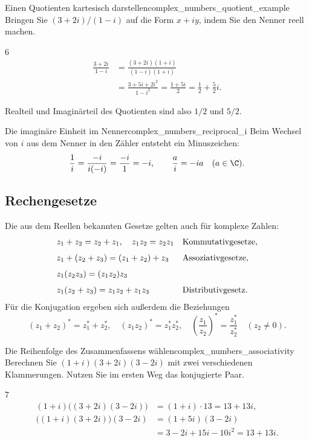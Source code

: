 \begin{ExampleBox}{Einen Quotienten kartesisch darstellen}{complex_numbers_quotient_example}
  Bringen Sie $(3+2i)/(1-i)$ auf die Form $x+iy$, indem Sie den Nenner reell machen.
  \begin{ClozeArea}{6}
    \[
      \begin{aligned}
        \frac{3+2i}{1-i}
          &=\frac{(3+2i)(1+i)}{(1-i)(1+i)}\\[6pt]
          &=\frac{3+5i+2i^2}{1-i^2}
           =\frac{1+5i}{2}=\frac12+\frac52i.
      \end{aligned}
    \]
  \end{ClozeArea}
  Realteil und Imaginärteil des Quotienten sind also $1/2$ und $5/2$.
\end{ExampleBox}
\begin{KeyPointBox}{Die imaginäre Einheit im Nenner}{complex_numbers_reciprocal_i}
  Beim Wechsel von $i$ aus dem Nenner in den Zähler entsteht ein Minuszeichen:
  \[
    \frac1i=\frac{-i}{i(-i)}=\frac{-i}{1}=-i,
    \qquad \frac{a}{i}=-ia\quad(a\in\C).
  \]
\end{KeyPointBox}

\clearpage
\subsection{Rechengesetze}
Die aus dem Reellen bekannten Gesetze gelten auch für komplexe Zahlen:
\[
  \begin{array}{@{}ll@{}}
    z_1+z_2=z_2+z_1,\quad z_1z_2=z_2z_1
      &\text{Kommutativgesetze},\\[7pt]
    z_1+(z_2+z_3)=(z_1+z_2)+z_3
      &\text{Assoziativgesetze},\\[7pt]
    z_1(z_2z_3)=(z_1z_2)z_3&\\[7pt]
    z_1(z_2+z_3)=z_1z_2+z_1z_3
      &\text{Distributivgesetz}.
  \end{array}
\]
Für die Konjugation ergeben sich außerdem die Beziehungen
\[
  (z_1+z_2)^*=z_1^*+z_2^*,\quad
  (z_1z_2)^*=z_1^*z_2^*,\quad
  \left(\frac{z_1}{z_2}\right)^*=\frac{z_1^*}{z_2^*}\quad(z_2\ne0).
\]
\begin{ExampleBox}{Die Reihenfolge des Zusammenfassens wählen}{complex_numbers_associativity}
  Berechnen Sie $(1+i)(3+2i)(3-2i)$ mit zwei verschiedenen Klammerungen.
  Nutzen Sie im ersten Weg das konjugierte Paar.
  \begin{ClozeArea}{7}
    \[
      \begin{aligned}
        (1+i)\bigl((3+2i)(3-2i)\bigr)
          &=(1+i)\cdot13=13+13i,\\[6pt]
        \bigl((1+i)(3+2i)\bigr)(3-2i)
          &=(1+5i)(3-2i)\\[6pt]
          &=3-2i+15i-10i^2=13+13i.
      \end{aligned}
    \]
  \end{ClozeArea}
\end{ExampleBox}

